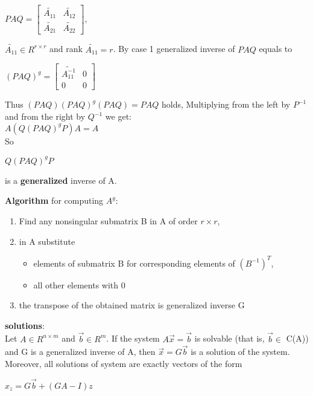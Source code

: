\documentclass{article}
\begin{document}
\begin{multicols}{3}
\begin{enumerate}
\begin{center}
\begin{math}
                PAQ =
                \begin{bmatrix}
                    \tilde{A_{11}} & \tilde{A_{12}} \\
                    \tilde{A_{21}} & \tilde{A_{22}}
                \end{bmatrix}
            \end{math},
        \end{center}
        $\tilde{A_{11}} \in R^{r \times r}$ and rank $\tilde{A_{11}} = r$. By case 1 
        generalized inverse of $PAQ$ equals to
        \begin{center}
            \begin{math}
                (PAQ)^g=
                \begin{bmatrix}
                    \tilde{A_{11}^{-1}} & 0 \\
                    0           & 0
                \end{bmatrix}
            \end{math}
        \end{center}
        Thus $(PAQ) (PAQ)^g (PAQ) = PAQ$ holds,
        Multiplying from the left by $P^{-1}$ and from the right
        by $Q^{-1}$ we get:\\ 
        $A(Q (PAQ)^g P)A = A$\\
        So \begin{center}
            \begin{math}
                Q (PAQ)^g P
            \end{math}
        \end{center}
        is a \textbf{generalized} inverse of A.
\end{enumerate}
\textbf{Algorithm} for computing \textbf{$A^g$}:
\begin{enumerate}
    \item Find any nonsingular submatrix B in A of order $r \times r$,
    \item in A substitute
        \begin{itemize}
            \item elements of submatrix B for corresponding elements of $(B^{-1})^T$,
            \item all other elements with 0
        \end{itemize}
    \item the transpose of the obtained matrix is generalized inverse G
\end{enumerate}
\textbf{solutions}:\\
Let $A \in R^{n \times m}$ and $\vec{b} \in R^m$. 
If the system $A\vec{x} = \vec{b}$ is
solvable (that is, $\vec{b} \in$ C(A)) and G is a 
generalized inverse of A, then $\vec{x}=G\vec{b}$ is
a solution of the system. Moreover, 
all solutions of system are exactly vectors of the form
\begin{center}
    \begin{math}
        x_z = G\vec{b} + (GA - I)z
    \end{math}
\end{center}


\end{multicols}
\end{document}
